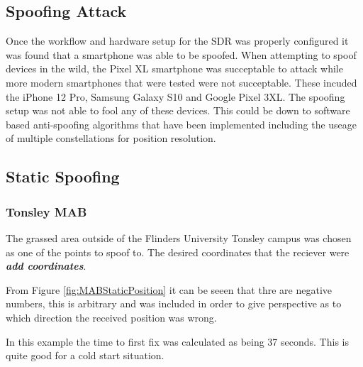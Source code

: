 \subsection{Spoofing Attack}
Once the workflow and hardware setup for the SDR was properly configured it was found that a smartphone was able to be spoofed.
When attempting to spoof devices in the wild, the Pixel XL smartphone was succeptable to attack while more modern smartphones that were tested were not succeptable. These
incuded the iPhone 12 Pro, Samsung Galaxy S10 and Google Pixel 3XL. The spoofing setup was not able to fool any of these devices. This could be down to software based
anti-spoofing algorithms that have been implemented including the useage of multiple constellations for position resolution.

\subsection{Static Spoofing}
\subsubsection{Tonsley MAB}
The grassed area outside of the Flinders University Tonsley campus was chosen as one of the points to spoof to. The desired coordinates that the reciever were
\emph{\textbf{add coordinates}}.

From Figure \ref{fig:MABStaticPosition} it can be seeen that thre are negative numbers, this is arbitrary and was included in order to give perspective as to which direction
the received position was wrong.

In this example the time to first fix was calculated as being 37 seconds. This is quite good for a cold start situation.

